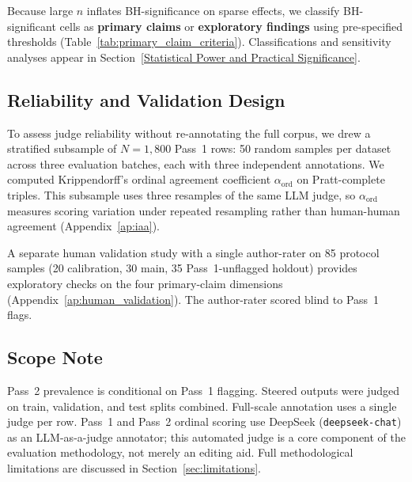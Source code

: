 Because large $n$ inflates BH-significance on sparse effects, we classify BH-significant cells as \textbf{primary claims} or \textbf{exploratory findings} using pre-specified thresholds (Table~\ref{tab:primary_claim_criteria}).
Classifications and sensitivity analyses appear in Section~\ref{Statistical Power and Practical Significance}.



\subsection{Reliability and Validation Design}\label{Reliability and Validation Design}
To assess judge reliability without re-annotating the full corpus, we drew a stratified subsample of $N{=}1{,}800$ Pass~1 rows: 50 random samples per dataset across three evaluation batches, each with three independent annotations.
We computed Krippendorff's ordinal agreement coefficient $\alpha_{\mathrm{ord}}$ on Pratt-complete triples.
This subsample uses three resamples of the same LLM judge, so $\alpha_{\mathrm{ord}}$ measures scoring variation under repeated resampling rather than human-human agreement (Appendix~\ref{ap:iaa}).

A separate human validation study with a single author-rater on 85 protocol samples (20 calibration, 30 main, 35 Pass~1-unflagged holdout) provides exploratory checks on the four primary-claim dimensions (Appendix~\ref{ap:human_validation}).
The author-rater scored blind to Pass~1 flags.

\subsection{Scope Note}
Pass~2 prevalence is conditional on Pass~1 flagging.
Steered outputs were judged on train, validation, and test splits combined.
Full-scale annotation uses a single judge per row.
Pass~1 and Pass~2 ordinal scoring use DeepSeek (\texttt{deepseek-chat}) as an LLM-as-a-judge annotator; this automated judge is a core component of the evaluation methodology, not merely an editing aid.
Full methodological limitations are discussed in Section~\ref{sec:limitations}.
